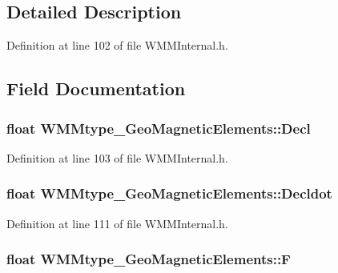 \subsection{\-Detailed \-Description}


\-Definition at line 102 of file \-W\-M\-M\-Internal.\-h.



\subsection{\-Field \-Documentation}
\hypertarget{struct_w_m_mtype___geo_magnetic_elements_a9a93785970d529cbca6172d59ca0d225}{
\subsubsection[{\-Decl}]{\setlength{\rightskip}{0pt plus 5cm}float {\bf \-W\-M\-Mtype\-\_\-\-Geo\-Magnetic\-Elements\-::\-Decl}}}\label{struct_w_m_mtype___geo_magnetic_elements_a9a93785970d529cbca6172d59ca0d225}


\-Definition at line 103 of file \-W\-M\-M\-Internal.\-h.

\hypertarget{struct_w_m_mtype___geo_magnetic_elements_a6c23bd42050e02810a937cd0316b9d8e}{
\subsubsection[{\-Decldot}]{\setlength{\rightskip}{0pt plus 5cm}float {\bf \-W\-M\-Mtype\-\_\-\-Geo\-Magnetic\-Elements\-::\-Decldot}}}\label{struct_w_m_mtype___geo_magnetic_elements_a6c23bd42050e02810a937cd0316b9d8e}


\-Definition at line 111 of file \-W\-M\-M\-Internal.\-h.

\hypertarget{struct_w_m_mtype___geo_magnetic_elements_af97c7b8926ffd4d694c4292916c2c153}{
\subsubsection[{\-F}]{\setlength{\rightskip}{0pt plus 5cm}float {\bf \-W\-M\-Mtype\-\_\-\-Geo\-Magnetic\-Elements\-::\-F}}}\label{struct_w_m_mtype___geo_magnetic_elements_af97c7b8926ffd4d694c4292916c2c153}



